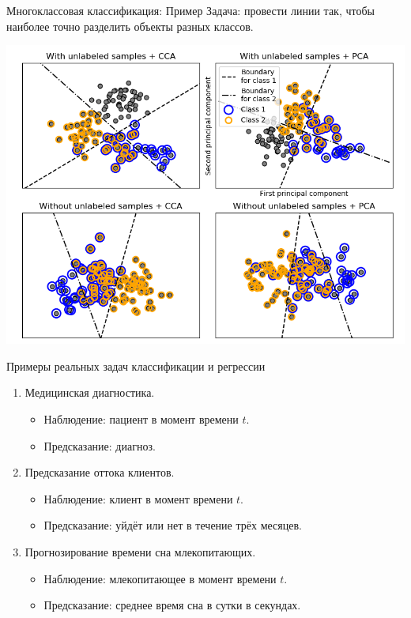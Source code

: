 \documentclass[c, handout]{beamer} %
\begin{document}
	\begin{frame}{Многоклассовая классификация: Пример}
		Задача: провести линии так, чтобы наиболее точно разделить объекты разных классов.
		
		\begin{center}
			\href{https://scikit-learn.org/stable/modules/multiclass.html}{\includegraphics[width=0.7\linewidth]{mlc.png}}
		\end{center}
	\end{frame}

	\begin{frame}{Примеры реальных задач классификации и регрессии}
		\begin{enumerate}
			\item<1-> Медицинская диагностика.
			\begin{itemize}
				\item Наблюдение: пациент в момент времени $t$.
				\item Предсказание: диагноз.
			\end{itemize}
			\item<2-> Предсказание оттока клиентов.
			\begin{itemize}
				\item Наблюдение: клиент в момент времени $t$.
				\item Предсказание: уйдёт или нет в течение трёх месяцев.
			\end{itemize}
			\item<3-> Прогнозирование времени сна млекопитающих.
			\begin{itemize}
				\item Наблюдение: млекопитающее в момент времени $t$.
				\item Предсказание: среднее время сна в сутки в секундах.
			\end{itemize}
		\end{enumerate}
	\end{frame}
\end{document}
